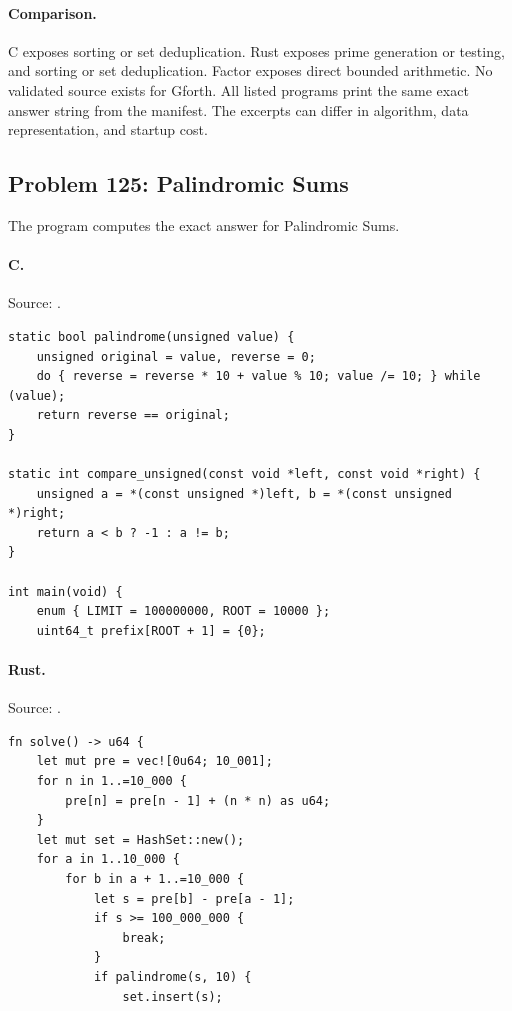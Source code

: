 \paragraph{Comparison.}
C exposes sorting or set deduplication. Rust exposes prime generation or testing, and sorting or set deduplication. Factor exposes direct bounded arithmetic.
No validated source exists for Gforth.
All listed programs print the same exact answer string from the manifest. The excerpts can differ in algorithm, data representation, and startup cost.

\subsection{Problem 125: Palindromic Sums}
\label{walkthrough:p125}
The program computes the exact answer for Palindromic Sums.

\paragraph{C.} Source: .
\begin{lstlisting}
static bool palindrome(unsigned value) {
    unsigned original = value, reverse = 0;
    do { reverse = reverse * 10 + value % 10; value /= 10; } while (value);
    return reverse == original;
}

static int compare_unsigned(const void *left, const void *right) {
    unsigned a = *(const unsigned *)left, b = *(const unsigned *)right;
    return a < b ? -1 : a != b;
}

int main(void) {
    enum { LIMIT = 100000000, ROOT = 10000 };
    uint64_t prefix[ROOT + 1] = {0};
\end{lstlisting}

\paragraph{Rust.} Source: .
\begin{lstlisting}
fn solve() -> u64 {
    let mut pre = vec![0u64; 10_001];
    for n in 1..=10_000 {
        pre[n] = pre[n - 1] + (n * n) as u64;
    }
    let mut set = HashSet::new();
    for a in 1..10_000 {
        for b in a + 1..=10_000 {
            let s = pre[b] - pre[a - 1];
            if s >= 100_000_000 {
                break;
            }
            if palindrome(s, 10) {
                set.insert(s);
\end{lstlisting}

